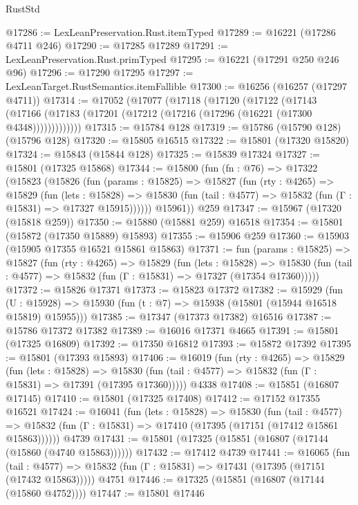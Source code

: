 \begin{lexlean}{RustStd}
\begin{coremodule}
@17286 := LexLeanPreservation.Rust.itemTyped
@17289 := @16221 (@17286 @4711 @246)
@17290 := @17285 @17289
@17291 := LexLeanPreservation.Rust.primTyped
@17295 := @16221 (@17291 @250 @246 @96)
@17296 := @17290 @17295
@17297 := LexLeanTarget.RustSemantics.itemFallible
@17300 := @16256 (@16257 (@17297 @4711))
@17314 := @17052
    (@17077
      (@17118
        (@17120
          (@17122
            (@17143
              (@17166 (@17183 (@17201 (@17212 (@17216 (@17296 (@16221 (@17300 @4348)))))))))))))
@17315 := @15784 @128
@17319 := @15786 (@15790 @128) (@15796 @128)
@17320 := @15805 @16515
@17322 := @15801 (@17320 @15820)
@17324 := @15843 (@15844 @128)
@17325 := @15839 @17324
@17327 := @15801 (@17325 @15868)
@17344 := @15800
    (fun (fn : @76) =>
    @17322
      (@15823
        (@15826
          (fun (params : @15825) =>
          @15827
            (fun (rty : @4265) =>
            @15829
              (fun (lets : @15828) =>
              @15830 (fun (tail : @4577) => @15832 (fun (Γ : @15831) => @17327 @15915))))))
        @15961))
    @259
@17347 := @15967 (@17320 (@15818 @259))
@17350 := @15880 (@15881 @259) @16518
@17354 := @15801 (@15872 (@17350 @15889) @15893)
@17355 := @15906 @259
@17360 := @15903 (@15905 @17355 @16521 @15861 @15863)
@17371 := fun (params : @15825) =>
  @15827
    (fun (rty : @4265) =>
    @15829
      (fun (lets : @15828) =>
      @15830 (fun (tail : @4577) => @15832 (fun (Γ : @15831) => @17327 (@17354 @17360)))))
@17372 := @15826 @17371
@17373 := @15823 @17372
@17382 := @15929
    (fun (U : @15928) => @15930 (fun (t : @7) => @15938 (@15801 (@15944 @16518 @15819) @15955)))
@17385 := @17347 (@17373 @17382) @16516
@17387 := @15786 @17372 @17382
@17389 := @16016 @17371 @4665
@17391 := @15801 (@17325 @16809)
@17392 := @17350 @16812
@17393 := @15872 @17392
@17395 := @15801 (@17393 @15893)
@17406 := @16019
    (fun (rty : @4265) =>
    @15829
      (fun (lets : @15828) =>
      @15830 (fun (tail : @4577) => @15832 (fun (Γ : @15831) => @17391 (@17395 @17360)))))
    @4338
@17408 := @15851 (@16807 @17145)
@17410 := @15801 (@17325 @17408)
@17412 := @17152 @17355 @16521
@17424 := @16041
    (fun (lets : @15828) =>
    @15830
      (fun (tail : @4577) =>
      @15832 (fun (Γ : @15831) => @17410 (@17395 (@17151 (@17412 @15861 @15863))))))
    @4739
@17431 := @15801 (@17325 (@15851 (@16807 (@17144 (@15860 (@4740 @15863))))))
@17432 := @17412 @4739
@17441 := @16065
    (fun (tail : @4577) => @15832 (fun (Γ : @15831) => @17431 (@17395 (@17151 (@17432 @15863)))))
    @4751
@17446 := @17325 (@15851 (@16807 (@17144 (@15860 @4752))))
@17447 := @15801 @17446

\end{coremodule}
\end{lexlean}
